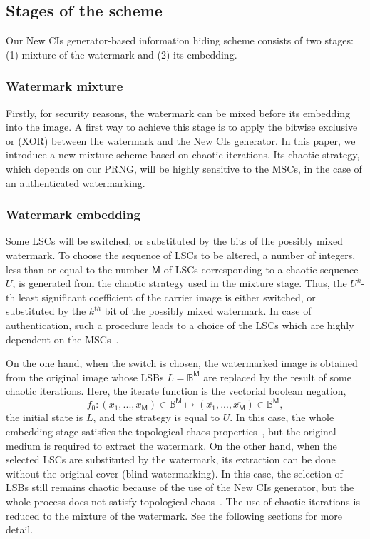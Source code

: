 \subsection{Stages of the scheme}

Our New CIs generator-based information hiding scheme consists of two stages: (1) mixture of the watermark and (2) its embedding.

\subsubsection{Watermark mixture}

Firstly, for security reasons, the watermark can be mixed before its embedding into the image. A first way to achieve this stage is to apply the bitwise exclusive or (XOR) between the watermark and the New CIs generator. In this paper, we introduce a new mixture scheme based on chaotic iterations. Its chaotic strategy, which depends on our PRNG, will be highly sensitive to the MSCs, in the case of an authenticated watermarking.%

\subsubsection{Watermark embedding}

Some LSCs will be switched, or substituted by the bits of the possibly mixed watermark. To choose the sequence of LSCs to be altered, a number of integers, less than or equal to the number $\mathsf{M}$ of LSCs corresponding to a chaotic sequence $U$, is generated from the chaotic strategy used in the mixture stage. Thus, the $U^{k}$-th least significant coefficient of the carrier image is either switched, or substituted by the $k^{th}$ bit of the possibly mixed watermark. In case of authentication, such a procedure leads to a choice of the LSCs which are highly dependent on the MSCs~\cite{guyeux10}.

On the one hand, when the switch is chosen, the watermarked image is obtained from the original image whose LSBs $L = \mathds{B}^{\mathsf{M}}$ are replaced by the result of some chaotic iterations. Here, the iterate function is the vectorial boolean negation,
\begin{equation}
f_0:(x_1,...,x_\mathsf{M}) \in \mathds{B}^\mathsf{M} \longmapsto (\overline{x_1},...,\overline{x_\mathsf{M}}) \in \mathds{B}^\mathsf{M},
\end{equation}
the initial state is $L$, and the strategy is equal to $U$. In this case, the whole embedding stage satisfies the topological chaos properties~\cite{guyeux10}, but the original medium is required to extract the watermark. On the other hand, when the selected LSCs are substituted by the watermark, its extraction can be done without the original cover (blind watermarking). In this case, the selection of LSBs still remains chaotic because of the use of the New CIs generator, but the whole process does not satisfy topological chaos~\cite{guyeux10}. The use of chaotic iterations is reduced to the mixture of the watermark. See the following sections for more detail.

